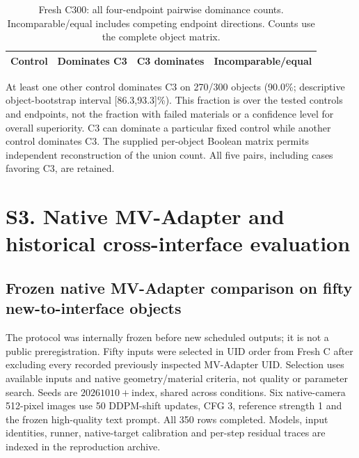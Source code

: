 \documentclass[11pt]{article}
\begin{document}
\begin{table}[ht]\centering\small
\caption{Fresh C300: all four-endpoint pairwise dominance counts. Incomparable/equal includes competing endpoint directions. Counts use the complete object matrix.}\label{tab:dominance015}
\begin{tabular}{lrrr}\toprule Control & Dominates C3 & C3 dominates & Incomparable/equal \\
\midrule\bottomrule\end{tabular}
\end{table}
At least one other control dominates C3 on 270/300 objects (90.0\%; descriptive object-bootstrap interval [86.3,93.3]\%). This fraction is over the tested controls and endpoints, not the fraction with failed materials or a confidence level for overall superiority. C3 can dominate a particular fixed control while another control dominates C3. The supplied per-object Boolean matrix permits independent reconstruction of the union count. All five pairs, including cases favoring C3, are retained.

\FloatBarrier
\section*{S3. Native MV-Adapter and historical cross-interface evaluation}
\label{supp:group3}

\subsection*{Frozen native MV-Adapter comparison on fifty new-to-interface objects}\label{supp:mva-native50}
The protocol was internally frozen before new scheduled outputs; it is not a public preregistration. Fifty inputs were selected in UID order from Fresh C after excluding every recorded previously inspected MV-Adapter UID. Selection uses available inputs and native geometry/material criteria, not quality or parameter search. Seeds are $20261010+\mathrm{index}$, shared across conditions. Six native-camera 512-pixel images use 50 DDPM-shift updates, CFG 3, reference strength 1 and the frozen high-quality text prompt. All 350 rows completed. Models, input identities, runner, native-target calibration and per-step residual traces are indexed in the reproduction archive.
\end{document}
